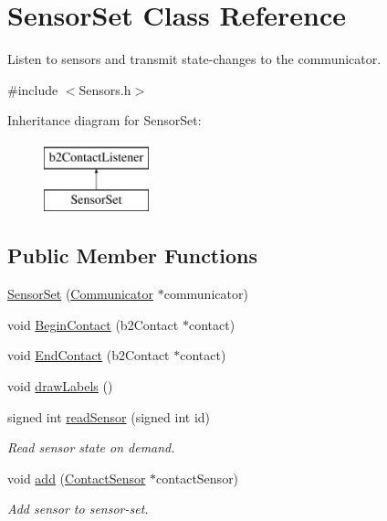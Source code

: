 \hypertarget{classSensorSet}{\section{Sensor\-Set Class Reference}
\label{classSensorSet}
}


Listen to sensors and transmit state-\/changes to the communicator.  




{\ttfamily \#include $<$Sensors.\-h$>$}

Inheritance diagram for Sensor\-Set\-:\begin{figure}[H]
\begin{center}
\leavevmode
\includegraphics[height=2.000000cm]{classSensorSet}
\end{center}
\end{figure}
\subsection*{Public Member Functions}
\begin{DoxyCompactItemize}
\item 
\hyperlink{classSensorSet_a2ebeeee6217e89c28ae767afb8cbc43e}{Sensor\-Set} (\hyperlink{classCommunicator}{Communicator} $\ast$communicator)
\item 
void \hyperlink{classSensorSet_aed0ec0b0d635de5ffa1f3a459ebf1a18}{Begin\-Contact} (b2\-Contact $\ast$contact)
\item 
void \hyperlink{classSensorSet_aaf34d48652893b393abe3e2c3e28e191}{End\-Contact} (b2\-Contact $\ast$contact)
\item 
void \hyperlink{classSensorSet_a35829e201b615e086bdb328b22f22ca5}{draw\-Labels} ()
\item 
signed int \hyperlink{classSensorSet_aaa08836d3cad9bbe5bca2f85bac25d9e}{read\-Sensor} (signed int id)
\begin{DoxyCompactList}\small\item\em Read sensor state on demand. \end{DoxyCompactList}\item 
void \hyperlink{classSensorSet_a638d99d8fb36d066c074b05f1dba016d}{add} (\hyperlink{classContactSensor}{Contact\-Sensor} $\ast$contact\-Sensor)
\begin{DoxyCompactList}\small\item\em Add sensor to sensor-\/set. \end{DoxyCompactList}\end{DoxyCompactItemize}
